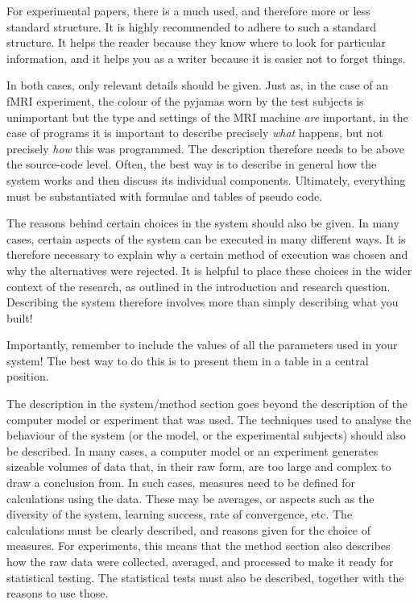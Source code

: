 For experimental papers, there is a much used, and therefore more or less standard structure.
It is  highly recommended to adhere to such a standard structure.
It helps the reader because they know where to look for particular information, and it helps you as a writer because it is easier not to forget things.

In both cases, only relevant details should be given.
Just as, in the case of an fMRI experiment, the colour of the pyjamas worn by the test subjects is unimportant but the type and settings of the MRI machine \textit{are} important, in the case of programs it is important to describe precisely \textit{what} happens, but not precisely \textit{how} this was programmed.
The description therefore needs to be above the source-code level.
Often, the best way is to describe in general how the system works and then discuss its individual components.
Ultimately, everything must be substantiated with formulae and tables of pseudo code.

The reasons behind certain choices in the system should also be given.
In many cases, certain aspects of the system can be executed in many different ways.
It is therefore necessary to explain why a certain method of execution was chosen and why the alternatives were rejected.
It is helpful to place these choices in the wider context of the research, as outlined in the introduction and research question.
Describing the system therefore involves more than simply describing what you built!

Importantly, remember to include the values of all the parameters used in your system! The best way to do this is to present them in a table in a central position.

The description in the system/method section goes beyond the description of the computer model or experiment that was used.
The techniques used to analyse the behaviour of the system (or the model, or the experimental subjects) should also be described.
In many cases, a computer model or an experiment generates sizeable volumes of data that, in their raw form, are too large and complex to draw a conclusion from.
In such cases, measures need to be defined for calculations using the data.
These may be averages, or aspects such as the diversity of the system, learning success, rate of convergence, etc.
The calculations must be clearly described, and reasons given for the choice of measures.
For experiments, this means that the method section also describes how the raw data were collected, averaged, and processed to make it ready for statistical testing.
The statistical tests must also be described, together with the reasons to use those.

